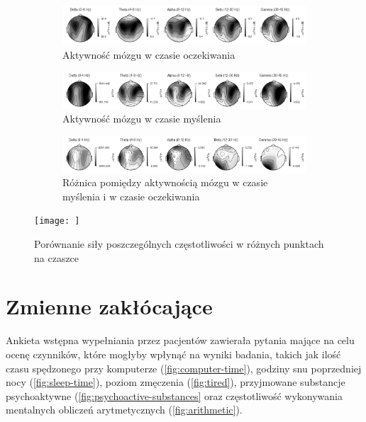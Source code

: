 \documentclass{./assets/wfis}
\begin{document}
\begin{figure}[h!]
    \centering
    \begin{subfigure}[b]{\textwidth}
    \centering
    \includegraphics[width=\columnwidth]{thesis/assets/waiting.png}
    \caption{Aktywność mózgu w czasie oczekiwania}
    \label{fig:waiting}
\end{subfigure}


\begin{subfigure}[b]{\textwidth}
    \centering
    \includegraphics[width=\columnwidth]{thesis/assets/thinking.png}
    \caption{Aktywność mózgu w czasie myślenia}
    \label{fig:thinking}
\end{subfigure}


\begin{subfigure}[b]{\textwidth}
    \centering
    \includegraphics[width=\columnwidth]{thesis/assets/diff.png}
    \caption{Różnica pomiędzy aktywnością mózgu w czasie myślenia i w czasie oczekiwania}
    \label{fig:diff}
\end{subfigure}
    \texttt{[image: ]}
    \caption{Porównanie siły poszczególnych częstotliwości w różnych punktach na czaszce}
    \label{fig:brain-heatmaps}
\end{figure}

\section{Zmienne zakłócające}\label{zmiennne-zaklucajace}
Ankieta wstępna wypełniania przez pacjentów zawierała pytania mające na celu ocenę czynników, które mogłyby wpłynąć na wyniki badania, takich jak ilość czasu spędzonego przy komputerze (\autoref{fig:computer-time}), godziny snu poprzedniej nocy (\autoref{fig:sleep-time}), poziom zmęczenia (\autoref{fig:tired}), przyjmowane substancje psychoaktywne (\autoref{fig:psychoactive-substances} oraz częstotliwość wykonywania mentalnych obliczeń arytmetycznych (\autoref{fig:arithmetic}).
\end{document}
